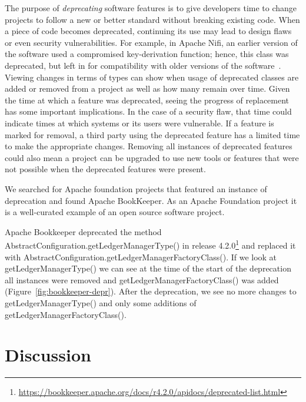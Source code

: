 The purpose of \emph{deprecating} software features is to give developers time to change projects to follow a new or better standard without breaking existing code. When a piece of code becomes deprecated, continuing its use may lead to design flaws or even security vulnerabilities. For example, in Apache Nifi, an earlier version of the software used a compromised key-derivation function; hence, this class was deprecated, but left in for compatibility with older versions of the software~\cite{nifi}. Viewing changes in terms of types can show when usage of deprecated classes are added or removed from a project as well as how many remain over time. Given the time at which a feature was deprecated, seeing the progress of replacement has some important implications. In the case of a security flaw, that time could indicate times at which systems or its users were vulnerable. If a feature is marked for removal, a third party using the deprecated feature has a limited time to make the appropriate changes. Removing all instances of deprecated features could also mean a project can be upgraded to use new tools or features that were not possible when the deprecated features were present.

We searched for Apache foundation projects that featured an instance of deprecation and found Apache BookKeeper. As an Apache Foundation project it is a well-curated example of an open source software project.

Apache Bookkeeper deprecated the method Abstract\-Configuration.\-get\-Ledger\-Manager\-Type() in release 4.2.0\footnote{\url{https://bookkeeper.apache.org/docs/r4.2.0/apidocs/deprecated-list.html}} and replaced it with Abstract\-Configuration.\-get\-Ledger\-Manager\-Factory\-Class(). If we look at get\-Ledger\-Manager\-Type() we can see at the time of the start of the deprecation all instances were removed and get\-Ledger\-Manager\-Factory\-Class() was added (Figure~\ref{fig:bookkeeper-depr}). After the deprecation, we see no more changes to get\-Ledger\-Manager\-Type() and only some additions of get\-Ledger\-Manager\-Factory\-Class().

\section{Discussion}

